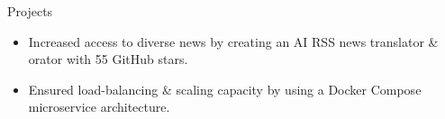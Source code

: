 \documentclass{resume} %
\begin{document}
\begin{workSection}{Projects}
	\customItem[
		title=\href{https://github.com/AshkanArabim/newsbridge}{Newsbridge (news.ashkan.zone) },
		technologies= | FastAPI{,} React{,} PostgreSQL{,} JavaScript{,} Docker,
		duration=%
	]
	\begin{itemize}
		\vspace{-0.5em}
		\itemsep -6pt {}
		\item Increased access to diverse news by creating an AI RSS news translator \& orator with {55 GitHub stars}.
		\item Ensured load-balancing \& scaling capacity by using a Docker Compose microservice architecture.
	\end{itemize}
	

\end{workSection}
\end{document}

